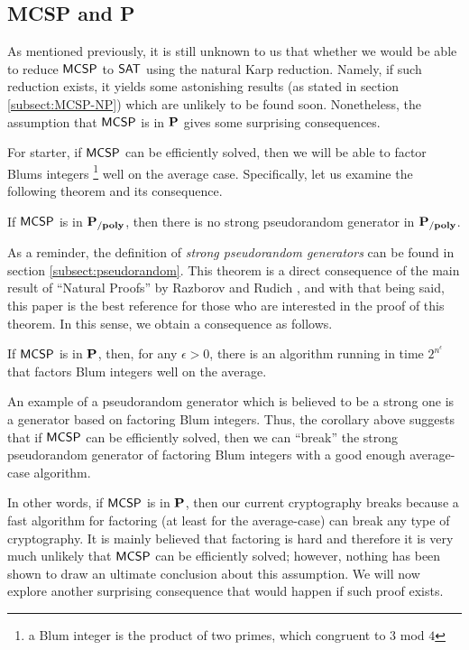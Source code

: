 \documentclass[11pt]{article}
\begin{document}
\subsection{MCSP and P}
As mentioned previously, it is still unknown to us that whether we would be able to reduce $\mathprob{MCSP}$ to $\mathprob{SAT}$ using the natural Karp reduction. Namely, if such reduction exists, it yields some astonishing results (as stated in section \ref{subsect:MCSP-NP}) which are unlikely to be found soon. Nonetheless, the assumption that $\mathprob{MCSP}$ is in $\P$ gives some surprising consequences. 

For starter, if $\mathprob{MCSP}$ can be efficiently solved, then we will be able to factor Blums integers \footnote{a Blum integer is the product of two primes, which congruent to $3$ mod $4$} well on the average case. Specifically, let us examine the following theorem and its consequence.

\begin{theorem}
	If $\mathprob{MCSP}$ is in $\Ppoly$, then there is no strong pseudorandom generator in $\Ppoly$.
\end{theorem}

As a reminder, the definition of \textit{strong pseudorandom generators} can be found in section \ref{subsect:pseudorandom}. This theorem is a direct consequence of the main result of ``Natural Proofs'' by Razborov and Rudich \cite{10.1006/jcss.1997.1494}, and with that being said, this paper is the best reference for those who are interested in the proof of this theorem. In this sense, we obtain a consequence as follows.

\begin{corollary}
	If $\mathprob{MCSP}$ is in $\P$, then, for any $\epsilon > 0$, there is an algorithm running in time $2^{n^{\epsilon}}$ that factors Blum integers well on the average.
\end{corollary}

An example of a pseudorandom generator which is believed to be a strong one is a generator based on factoring Blum integers. Thus, the corollary above suggests that if $\mathprob{MCSP}$ can be efficiently solved, then we can ``break'' the strong pseudorandom generator of factoring Blum integers with a good enough average-case algorithm.  

In other words, if $\mathprob{MCSP}$ is in $\P$, then our current cryptography breaks because a fast algorithm for factoring (at least for the average-case) can break any type of cryptography. It is mainly believed that factoring is hard and therefore it is very much unlikely that $\mathprob{MCSP}$ can be efficiently solved; however, nothing has been shown to draw an ultimate conclusion about this assumption. We will now explore another surprising consequence that would happen if such proof exists.
\end{document}
